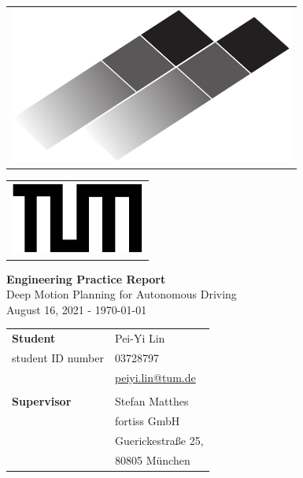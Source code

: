 \documentclass[inputenc=utf8]{ldvarticle}
\begin{document}
\begin{titlepage}

	\noindent
	\begin{tabular}[t]{@{}l} 
  	\includegraphics [scale= 0.4]{./img/Logo/LDVLogoS_oT.pdf}\\[0.2cm]
	\end{tabular}
	\hfill%
	\begin{tabular}[t]{l@{}}
	\includegraphics[scale= 0.8]{./img/Logo/TUMLogo_oZ_Vollfl_sw.pdf}\\[0.2cm]	
	\end{tabular}
	
\begin{center}

	\Huge \textbf {Engineering Practice Report} \\
	\huge{Deep Motion Planning for Autonomous Driving}\\
	\Large{August 16, 2021 - {\today} }
	
	\vfill\noindent
	\begin{table}[h!]
	\centering
	\begin{tabular}{ll}
	\textbf {Student}& Pei-Yi Lin       \\
	student ID number & 03728797                   \\
	  & \underline{peiyi.lin@tum.de} \\
	\\
	\textbf {Supervisor}  & Stefan Matthes                             \\
	 & fortiss GmbH                           \\
	& Guerickestraße 25,                          \\
	& 80805 München                          
	\end{tabular}
	\end{table}

		
\end{center}
\end{titlepage}
\end{document}
